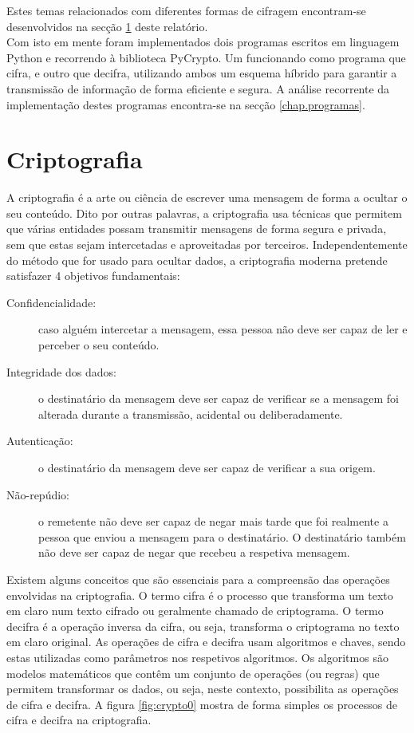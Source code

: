 \documentclass[a4paper,11pt,openright,oneside]{report}
\begin{document}
Estes temas relacionados com diferentes formas de cifragem encontram-se desenvolvidos na secção \ref{chap.criptografia} deste relatório.\\

Com isto em mente foram implementados dois programas escritos em linguagem Python e recorrendo à biblioteca PyCrypto. Um funcionando como programa que cifra, e outro que decifra, utilizando ambos um esquema híbrido para garantir a transmissão de informação de forma eficiente e segura. A análise recorrente da implementação destes programas encontra-se na secção \ref{chap.programas}.

\chapter{Criptografia}
\label{chap.criptografia}

A criptografia é a arte ou ciência de escrever uma mensagem de forma a ocultar o seu conteúdo. Dito por outras palavras, a criptografia usa técnicas que permitem que várias entidades possam transmitir mensagens de forma segura e privada, sem que estas sejam intercetadas e aproveitadas por terceiros. Independentemente do método que for usado para ocultar dados, a criptografia moderna pretende satisfazer 4 objetivos fundamentais:

\begin{description}
\item[Confidencialidade:] caso alguém intercetar a mensagem, essa pessoa não deve ser capaz de ler e perceber o seu conteúdo.
\item[Integridade dos dados:] o destinatário da mensagem deve ser capaz de verificar se a mensagem foi alterada durante a transmissão, acidental ou deliberadamente.
\item[Autenticação:] o destinatário da mensagem deve ser capaz de verificar a sua origem.
\item[Não-repúdio:] o remetente não deve ser capaz de negar mais tarde que foi realmente a pessoa que enviou a mensagem para o destinatário. O destinatário também não deve ser capaz de negar que recebeu a respetiva mensagem.
\end{description}

Existem alguns conceitos que são essenciais para a compreensão das operações envolvidas na criptografia. O termo cifra é o processo que transforma um texto em claro num texto cifrado ou geralmente chamado de criptograma. O termo decifra é a operação inversa da cifra, ou seja, transforma o criptograma no texto em claro original. As operações de cifra e decifra usam algoritmos e chaves, sendo estas utilizadas como parâmetros nos respetivos algoritmos. Os algoritmos são modelos matemáticos que contêm um conjunto de operações (ou regras) que permitem transformar os dados, ou seja, neste contexto, possibilita as operações de cifra e decifra. A figura \ref{fig:crypto0} mostra de forma simples os processos de cifra e decifra na criptografia.
\end{document}
